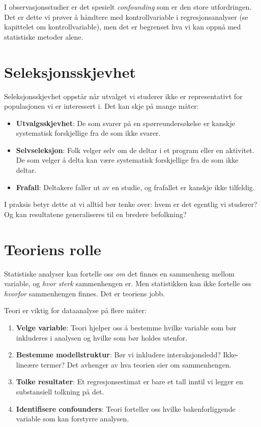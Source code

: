 \documentclass[
  norsk,
  letterpaper,
  DIV=11,
  numbers=noendperiod]{scrreprt}
\providecommand{\tightlist}{%
  \setlength{\itemsep}{0pt}\setlength{\parskip}{0pt}}
\theoremstyle{definition}
\theoremstyle{remark}
\begin{document}
I observasjonsstudier er det spesielt \emph{confounding} som er den
store utfordringen. Det er dette vi prøver å håndtere med
kontrollvariable i regresjonsanalyser (se kapittelet om
kontrollvariable), men det er begrenset hva vi kan oppnå med statistiske
metoder alene.

\section{Seleksjonsskjevhet}\label{seleksjonsskjevhet}

Seleksjonsskjevhet oppstår når utvalget vi studerer ikke er
representativt for populasjonen vi er interessert i. Det kan skje på
mange måter:

\begin{itemize}
\tightlist
\item
  \textbf{Utvalgsskjevhet}: De som svarer på en spørreundersøkelse er
  kanskje systematisk forskjellige fra de som ikke svarer.
\item
  \textbf{Selvseleksjon}: Folk velger selv om de deltar i et program
  eller en aktivitet. De som velger å delta kan være systematisk
  forskjellige fra de som ikke deltar.
\item
  \textbf{Frafall}: Deltakere faller ut av en studie, og frafallet er
  kanskje ikke tilfeldig.
\end{itemize}

I praksis betyr dette at vi alltid bør tenke over: hvem er det egentlig
vi studerer? Og kan resultatene generaliseres til en bredere befolkning?

\section{Teoriens rolle}\label{teoriens-rolle}

Statistiske analyser kan fortelle oss \emph{om} det finnes en sammenheng
mellom variable, og \emph{hvor sterk} sammenhengen er. Men statistikken
kan ikke fortelle oss \emph{hvorfor} sammenhengen finnes. Det er
teoriens jobb.

Teori er viktig for dataanalyse på flere måter:

\begin{enumerate}
\def\labelenumi{\arabic{enumi}.}
\tightlist
\item
  \textbf{Velge variable}: Teori hjelper oss å bestemme hvilke variable
  som bør inkluderes i analysen og hvilke som bør holdes utenfor.
\item
  \textbf{Bestemme modellstruktur}: Bør vi inkludere interaksjonsledd?
  Ikke-lineære termer? Det avhenger av hva teorien sier om sammenhengen.
\item
  \textbf{Tolke resultater}: Et regresjonsestimat er bare et tall inntil
  vi legger en substansiell tolkning på det.
\item
  \textbf{Identifisere confounders}: Teori forteller oss hvilke
  bakenforliggende variable som kan forstyrre analysen.
\end{enumerate}
\end{document}
